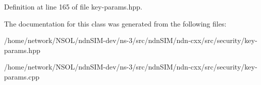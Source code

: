 Definition at line 165 of file key-\/params.\+hpp.



The documentation for this class was generated from the following files\+:\begin{DoxyCompactItemize}
\item 
/home/network/\+N\+S\+O\+L/ndn\+S\+I\+M-\/dev/ns-\/3/src/ndn\+S\+I\+M/ndn-\/cxx/src/security/key-\/params.\+hpp\item 
/home/network/\+N\+S\+O\+L/ndn\+S\+I\+M-\/dev/ns-\/3/src/ndn\+S\+I\+M/ndn-\/cxx/src/security/key-\/params.\+cpp\end{DoxyCompactItemize}
